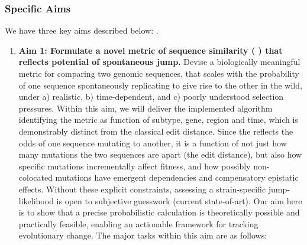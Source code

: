 \documentclass[onecolumn, compsoc,12pt]{IEEEtran}
\begin{document}
\subsubsection*{Specific Aims} We have three key aims described below: .%
\begin{enumerate} 
[label=$\square$, leftmargin=0pt,
labelindent=0em, topsep=0.1em, labelsep=*, itemsep=.5em,itemindent=1em]
\item \textbf{Aim 1: Formulate a novel metric of sequence similarity ( \qdist) that reflects potential of spontaneous jump.} Devise a  biologically meaningful metric for comparing two genomic sequences, that scales with the probability of one sequence spontaneously replicating to give rise to the other in the wild, under a) realistic, b) time-dependent, and c) poorly understood selection pressures. Within this aim, we will deliver the implemented  algorithm  identifying the \qdist metric as function of subtype, gene, region and time, which is demonstrably distinct from the classical edit distance. Since the \qdist  reflects the odds of one sequence mutating  to  another, it is a function of not just how many mutations the two sequences are apart (the edit distance), but also how  specific mutations  incrementally affect fitness, and how possibly non-colocated mutations have  emergent dependencies and compensatory epistatic effects. Without these explicit constraints, assessing a strain-specific jump-likelihood  is open to subjective guesswork (current state-of-art). Our aim here is to show that a  precise probabilistic calculation is theoretically possible and practically feasible, enabling an actionable framework for tracking evolutionary change. The major tasks within this aim are as follows:
\end{enumerate}
\end{document}
